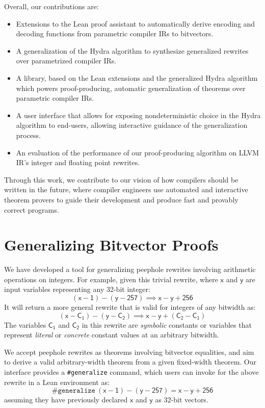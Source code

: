 \documentclass[review, anonymous, acmsmall]{acmart}
\newcommand{\blockmath}[1]{\[\mathsf{#1}\]}
\newcommand{\inline}[1]{$\mathsf{#1}$}
\begin{document}
Overall, our contributions are:
\begin{itemize}
	\item Extensions to the Lean proof assistant to automatically derive encoding
    and decoding functions from parametric compiler IRs to bitvectors.
	\item A generalization of the Hydra algorithm to synthesize generalized rewrites over parametrized compiler IRs.
	\item A library, based on the Lean extensions and the generalized Hydra algorithm which powers
    proof-producing, automatic generalization of theorems over parametric compiler IRs.
  \item A user interface that allows for exposing nondeterministic choice in the
    Hydra algorithm to end-users, allowing interactive guidance of the generalization process.
  \item An evaluation of the performance of our proof-producing algorithm on LLVM IR's integer and floating point rewrites.
\end{itemize}

Through this work, we contribute to our vision of how compilers should be written in the future,
where compiler engineers use automated and interactive theorem provers to guide their development and produce fast and provably correct programs.

\section{Generalizing Bitvector Proofs}

We have developed a tool for generalizing peephole rewrites involving arithmetic operations on integers. For example, given this trivial rewrite, where \inline{x} and \inline{y} are input variables representing any 32-bit integer:
\blockmath{(x - 1) - (y - 257) \implies x - y + 256}
It will return a more general rewrite that is valid for integers of any bitwidth as:  
\blockmath{(x - C_1) - (y - C_2) \implies x - y + (C_2 - C_1)}
The variables \inline{C_1} and \inline{C_2} in this rewrite are \textit{symbolic} constants or variables that represent \textit{literal} or \textit{concrete} constant values at an arbitrary bitwidth. 

We accept peephole rewrites as theorems involving bitvector equalities, and aim to derive a valid arbitrary-width theorem from a given fixed-width theorem. Our interface provides a \texttt{\#generalize} command, which users can invoke for the above rewrite in a Lean environment as:
\blockmath{\texttt{\#generalize}\ (x - 1) - (y - 257) = x - y + 256}
assuming they have previously declared \inline{x} and \inline{y} as 32-bit vectors.
\end{document}
